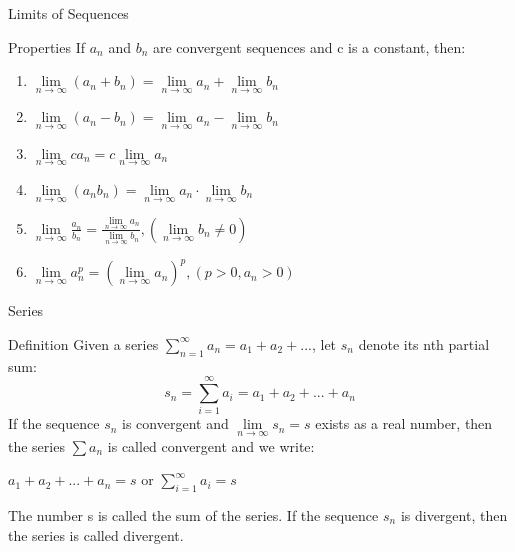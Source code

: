 \documentclass{beamer}
\begin{document}
\begin{frame}{Limits of Sequences}
    \begin{block}{Properties}
        If {$a_n$} and {$b_n$} are convergent sequences and c is a constant, then:
        \begin{enumerate}
        \item $\mathop{lim} \limits_{n \rightarrow \infty}(a_n+b_n)=\mathop{lim} \limits_{n \rightarrow \infty} a_n+ \mathop{lim} \limits_{n \rightarrow \infty}b_n$
        \item $\mathop{lim} \limits_{n \rightarrow \infty}(a_n-b_n)=\mathop{lim} \limits_{n \rightarrow \infty} a_n- \mathop{lim} \limits_{n \rightarrow \infty}b_n$
        \item $\mathop{lim} \limits_{n \rightarrow \infty} c a_n= c\mathop{lim} \limits_{n \rightarrow \infty} a_n$
        \item $\mathop{lim} \limits_{n \rightarrow \infty}(a_n b_n)=\mathop{lim} \limits_{n \rightarrow \infty}a_n \cdot \mathop{lim} \limits_{n \rightarrow \infty} b_n$
        \item $\mathop{lim} \limits_{n \rightarrow \infty}\frac{a_n}{b_n} =\frac{\mathop{lim} \limits_{n \rightarrow \infty} a_n}{\mathop{lim} \limits_{n \rightarrow \infty}b_n},(\mathop{lim} \limits_{n \rightarrow \infty}b_n \neq 0)$
        \item $\mathop{lim} \limits_{n \rightarrow \infty} a_n ^p = (\mathop{lim} \limits_{n \rightarrow \infty} a_n)^p,(p>0, a_n>0)$
        \end{enumerate}
    \end{block}
\end{frame}

\begin{frame}{Series}
    \begin{block}{Definition}
        Given a series $\sum\limits_{n=1}^{\infty} a_n = a_1 + a_2 + ...$, let $s_n$ denote  its nth partial sum:\\
        $$s_n=\sum\limits_{i=1}^{\infty} a_i = a_1 + a_2 + ...+a_n$$
        If the sequence {$s_n$} is convergent and $\mathop{lim} \limits_{n \rightarrow \infty}  s_n = s$ exists as a real number, then the series $\sum a_n$ is called convergent and we write:\\
        \begin{center}
            $a_1+a_2+...+a_n=s$ or $\sum\limits_{i=1}^{\infty} a_i= s$
        \end{center}
        The number s is called the sum of the series. If the sequence {$s_n$} is divergent, then the series is called divergent.
    \end{block}
\end{frame}
\end{document}
